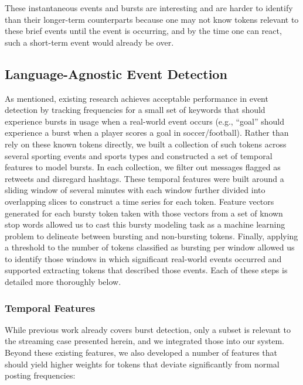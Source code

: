 \documentclass{acm_proc_article-sp}
\begin{document}
These instantaneous events and bursts are interesting and are harder to identify than their longer-term counterparts because one may not know tokens relevant to these brief events until the event is occurring, and by the time one can react, such a short-term event would already be over.

\subsection{Language-Agnostic Event Detection}

As mentioned, existing research achieves acceptable performance in event detection by tracking frequencies for a small set of keywords that should experience bursts in usage when a real-world event occurs (e.g., ``goal'' should experience a burst when a player scores a goal in soccer/football).
Rather than rely on these known tokens directly, we built a collection of such tokens across several sporting events and sports types and constructed a set of temporal features to model bursts.
In each collection, we filter out messages flagged as retweets and disregard hashtags.
These temporal features were built around a sliding window of several minutes with each window further divided into overlapping slices to construct a time series for each token.
Feature vectors generated for each bursty token taken with those vectors from a set of known stop words allowed us to cast this bursty modeling task as a machine learning problem to delineate between bursting and non-bursting tokens.
Finally, applying a threshold to the number of tokens classified as bursting per window allowed us to identify those windows in which significant real-world events occurred and supported extracting tokens that described those events.
Each of these steps is detailed more thoroughly below.

\subsubsection{Temporal Features}

While previous work already covers burst detection, only a subset is relevant to the streaming case presented herein, and we integrated those into our system.
Beyond these existing features, we also developed a number of features that should yield higher weights for tokens that deviate significantly from normal posting frequencies:
\end{document}
